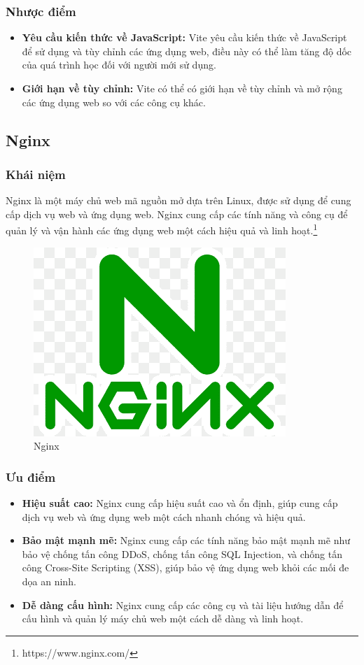 \subsubsection{Nhược điểm}
\begin{itemize}
  \item \textbf{Yêu cầu kiến thức về JavaScript:} Vite yêu cầu kiến thức về JavaScript để sử dụng và tùy chỉnh các ứng dụng web, điều này có thể làm tăng độ dốc của quá trình học đối với người mới sử dụng.
  \item \textbf{Giới hạn về tùy chỉnh:} Vite có thể có giới hạn về tùy chỉnh và mở rộng các ứng dụng web so với các công cụ khác.
\end{itemize}
\subsection{Nginx}
\subsubsection{Khái niệm}
\noindent Nginx là một máy chủ web mã nguồn mở dựa trên Linux, được sử dụng để cung cấp dịch vụ web và ứng dụng web. Nginx cung cấp các tính năng và công cụ để quản lý và vận hành các ứng dụng web một cách hiệu quả và linh hoạt.\footnote{https://www.nginx.com/}
\begin{figure}[H]
  \begin{center}
    \includegraphics[scale=0.4]{images/hieu/phuluc/nginx.png}
    \caption{Nginx}
  \end{center}
\end{figure}
\subsubsection{Ưu điểm}
\begin{itemize}
  \item \textbf{Hiệu suất cao:} Nginx cung cấp hiệu suất cao và ổn định, giúp cung cấp dịch vụ web và ứng dụng web một cách nhanh chóng và hiệu quả.
  \item \textbf{Bảo mật mạnh mẽ:} Nginx cung cấp các tính năng bảo mật mạnh mẽ như bảo vệ chống tấn công DDoS, chống tấn công SQL Injection, và chống tấn công Cross-Site Scripting (XSS), giúp bảo vệ ứng dụng web khỏi các mối đe dọa an ninh.
  \item \textbf{Dễ dàng cấu hình:} Nginx cung cấp các công cụ và tài liệu hướng dẫn để cấu hình và quản lý máy chủ web một cách dễ dàng và linh hoạt.
\end{itemize}
